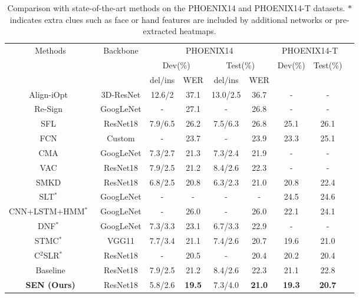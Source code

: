 \documentclass[letterpaper]{article} \usepackage{aaai23}  \usepackage{times}  \usepackage{helvet}  \usepackage{courier}  \usepackage[hyphens]{url}  \usepackage{graphicx} \urlstyle{rm} \def\UrlFont{\rm}  \usepackage{natbib}  \usepackage{caption} \frenchspacing  \setlength{\pdfpagewidth}{8.5in} \setlength{\pdfpageheight}{11in} \usepackage{algorithm}
\begin{document}
\begin{table*}[t]   
  \centering
  \setlength\tabcolsep{3pt}
  \begin{tabular}{ccccccccc}
  \hline
  \multirow{3}{*}{Methods} &\multirow{3}{*}{Backbone} & \multicolumn{4}{c}{PHOENIX14} & \multicolumn{2}{c}{PHOENIX14-T} \\
  & &\multicolumn{2}{c}{Dev(\%)} & \multicolumn{2}{c}{Test(\%)} &  \multirow{2}{*}{Dev(\%)} & \multirow{2}{*}{Test(\%)}\\
  & &del/ins & WER & del/ins& WER & & \\
  \hline
Align-iOpt~\cite{pu2019iterative}& 3D-ResNet &12.6/2 & 37.1& 13.0/2.5 & 36.7 & -&-\\
  Re-Sign~\cite{koller2017re}& GoogLeNet&- & 27.1 &- &26.8 &- &-\\
  SFL~\cite{niu2020stochastic}& ResNet18 & 7.9/6.5 & 26.2 & 7.5/6.3& 26.8 & 25.1&26.1\\
FCN~\cite{cheng2020fully}& Custom & - & 23.7 & -& 23.9 & 23.3& 25.1\\
  CMA~\cite{pu2020boosting} & GoogLeNet & 7.3/2.7 & 21.3 & 7.3/2.4 & 21.9  & -&-\\
  VAC~\cite{Min_2021_ICCV}& ResNet18 & 7.9/2.5 & 21.2 &8.4/2.6 & 22.3 &- &-\\
  SMKD~\cite{hao2021self}& ResNet18 &6.8/2.5 &20.8 &6.3/2.3 & 21.0 & 20.8 & 22.4\\
  \hline
  SLT$^*$~\cite{camgoz2018neural}& GoogLeNet  & - & - & - & - & 24.5 & 24.6\\
  CNN+LSTM+HMM$^*$~\cite{koller2019weakly}& GoogLeNet  & - &26.0 & - & 26.0 & 22.1 & 24.1 \\
  DNF$^*$~\cite{cui2019deep}& GoogLeNet  & 7.3/3.3 &23.1& 6.7/3.3 & 22.9 & - & -\\
  STMC$^*$~\cite{zhou2020spatial}& VGG11 & 7.7/3.4 &21.1 & 7.4/2.6 & 20.7 & 19.6 & 21.0\\
  C$^2$SLR$^*$~\cite{zuo2022c2slr} & ResNet18 & - & 20.5 &- & 20.4 & 20.2 & 20.4  \\
  \hline
  Baseline & ResNet18 & 7.9/2.5 & 21.2 &8.4/2.6 & 22.3 & 21.1 & 22.8\\
  \textbf{SEN (Ours)} & ResNet18 & 5.8/2.6  &\textbf{19.5} &   7.3/4.0 & \textbf{21.0}  & \textbf{19.3} & \textbf{20.7} \\
  \hline   
  \end{tabular}  
  \caption{Comparison with state-of-the-art methods on the PHOENIX14 and PHOENIX14-T datasets. $*$ indicates extra clues such as face or hand features are included by additional networks or pre-extracted heatmaps.} 
  \label{tab7}
\end{table*}
\end{document}
